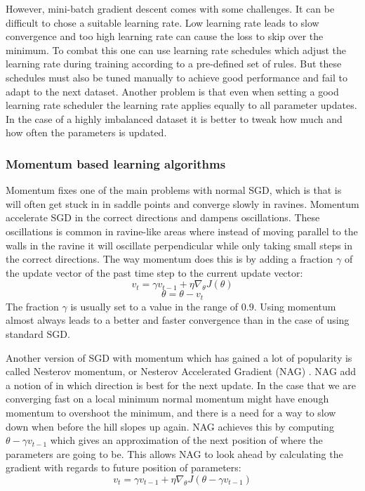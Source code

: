 \documentclass[thesis.tex]{subfiles}
\begin{document}
However, mini-batch gradient descent comes with some challenges. It can be difficult to chose a suitable learning rate. Low learning rate leads to slow convergence and too high learning rate can cause the loss to skip over the minimum. To combat this one can use learning rate schedules which adjust the learning rate during training according to a pre-defined set of rules. But these schedules must also be tuned manually to achieve good performance and fail to adapt to the next dataset. Another problem is that even when setting a good learning rate scheduler the learning rate applies equally to all parameter updates. In the case of a highly imbalanced dataset it is better to tweak how much and how often the parameters is updated.

\subsubsection{Momentum based learning algorithms}
Momentum \cite{MomentumTerm99} fixes one of the main problems with normal SGD, which is that is will often get stuck in in saddle points \cite{IdentifyingAttacking14} and converge slowly in ravines. Momentum accelerate SGD in the correct directions and dampens oscillations. These oscillations is common in ravine-like areas where instead of moving parallel to the walls in the ravine it will oscillate perpendicular while only taking small steps in the correct directions. The way momentum does this is by adding a fraction $\gamma$ of the update vector of the past time step to the current update vector: 
$$ v_t = \gamma v_{t-1}+\eta \nabla_\theta J(\theta) $$
$$ \theta = \theta - v_t $$
The fraction $\gamma$ is usually set to a value in the range of $0.9$. Using momentum almost always leads to a better and faster convergence than in the case of using standard SGD. 

Another version of SGD with momentum which has gained a lot of popularity is called Nesterov momentum, or Nesterov Accelerated Gradient (NAG) \cite{MethodUnconstrained83}. NAG add a notion of in which direction is best for the next update. In the case that we are converging fast on a local minimum normal momentum might have enough momentum to overshoot the minimum, and there is a need for a way to slow down when before the hill slopes up again. 
NAG achieves this by computing $\theta - \gamma v_{t-1}$ which gives an approximation of the next position of where the parameters are going to be. This allows NAG to look ahead by calculating the gradient with regards to future position of parameters: 
$$ v_t = \gamma v_{t-1} + \eta \nabla_\theta J(\theta-\gamma v_{t-1}) $$
\end{document}
